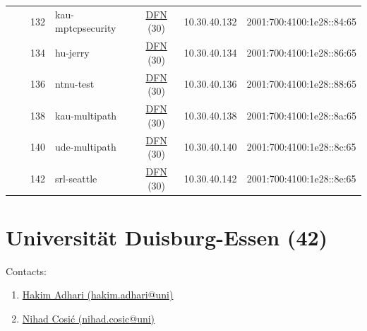 \begin{small}
\begin{center}
\begin{longtable}{|c|c|c|c|c|c|c|c|}
  &  & \tiny{132} & \multicolumn{1}{|l|}{\tiny{kau-mptcpsecurity}} & \multicolumn{2}{|c|}{\tiny{\href{https://www.dfn.de}{DFN} (30)}} & \tiny{10.30.40.132} & \tiny{2001:700:4100:1e28::84:65} \\* \cline{3-3}\cline{4-4}\cline{5-5}\cline{6-6}\cline{7-7}\cline{8-8}
  &  & \tiny{134} & \multicolumn{1}{|l|}{\tiny{hu-jerry}} & \multicolumn{2}{|c|}{\tiny{\href{https://www.dfn.de}{DFN} (30)}} & \tiny{10.30.40.134} & \tiny{2001:700:4100:1e28::86:65} \\* \cline{3-3}\cline{4-4}\cline{5-5}\cline{6-6}\cline{7-7}\cline{8-8}
  &  & \tiny{136} & \multicolumn{1}{|l|}{\tiny{ntnu-test}} & \multicolumn{2}{|c|}{\tiny{\href{https://www.dfn.de}{DFN} (30)}} & \tiny{10.30.40.136} & \tiny{2001:700:4100:1e28::88:65} \\* \cline{3-3}\cline{4-4}\cline{5-5}\cline{6-6}\cline{7-7}\cline{8-8}
  &  & \tiny{138} & \multicolumn{1}{|l|}{\tiny{kau-multipath}} & \multicolumn{2}{|c|}{\tiny{\href{https://www.dfn.de}{DFN} (30)}} & \tiny{10.30.40.138} & \tiny{2001:700:4100:1e28::8a:65} \\* \cline{3-3}\cline{4-4}\cline{5-5}\cline{6-6}\cline{7-7}\cline{8-8}
  &  & \tiny{140} & \multicolumn{1}{|l|}{\tiny{ude-multipath}} & \multicolumn{2}{|c|}{\tiny{\href{https://www.dfn.de}{DFN} (30)}} & \tiny{10.30.40.140} & \tiny{2001:700:4100:1e28::8c:65} \\* \cline{3-3}\cline{4-4}\cline{5-5}\cline{6-6}\cline{7-7}\cline{8-8}
  &  & \tiny{142} & \multicolumn{1}{|l|}{\tiny{srl-seattle}} & \multicolumn{2}{|c|}{\tiny{\href{https://www.dfn.de}{DFN} (30)}} & \tiny{10.30.40.142} & \tiny{2001:700:4100:1e28::8e:65} \\ \hline
\end{longtable}
\end{center}
\end{small}



\section{Universität Duisburg-Essen (42)}
\label{sec:UDE}

Contacts:
\begin{enumerate}
 \item {}\href{mailto:hakim.adhari@uni}{Hakim Adhari (hakim.adhari@uni)}
 \item {}\href{mailto:nihad.cosic@uni}{Nihad Cosić (nihad.cosic@uni)}
\end{enumerate}

